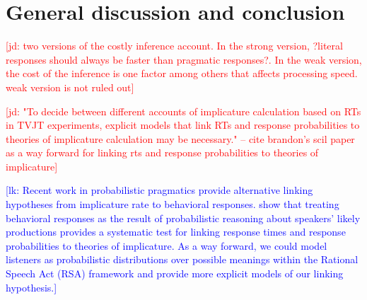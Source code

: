 \documentclass[10pt,letterpaper]{article}
\newcommand{\jd}[1]{\textcolor{Red}{[jd: #1]}}
\newcommand{\lk}[1]{\textcolor{Blue}{[lk: #1]}}
\begin{document}


\section{General discussion and conclusion}

\jd{two versions of the costly inference account. In the strong version, ?literal responses should always be faster than pragmatic responses?. In the weak version, the cost of the inference is one factor among others that affects processing speed. weak version is not ruled out}

\jd{"To decide between different accounts of implicature calculation based on RTs in TVJT experiments, explicit models that link RTs and response probabilities to theories of implicature calculation may be necessary." -- cite brandon's scil paper as a way forward for linking rts and response probabilities to theories of implicature}

\lk{Recent work in probabilistic pragmatics provide alternative linking hypotheses from implicature rate to behavioral responses. \citeA{Waldon2020} show that treating behavioral responses as the result of probabilistic reasoning about speakers’ likely productions provides a systematic test for linking response times and response probabilities to theories of implicature. As a way forward, we could model listeners as probabilistic distributions over possible meanings within the Rational Speech Act (RSA) framework and provide more explicit models of our linking hypothesis.}
\end{document}
